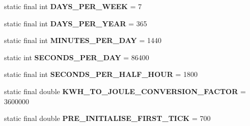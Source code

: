 \begin{DoxyCompactItemize}
\item 
\hypertarget{classuk_1_1ac_1_1dmu_1_1iesd_1_1cascade_1_1base_1_1_consts_a1741a7da07e720b3091c3be0059db491}{static final int {\bfseries D\-A\-Y\-S\-\_\-\-P\-E\-R\-\_\-\-W\-E\-E\-K} = 7}\label{classuk_1_1ac_1_1dmu_1_1iesd_1_1cascade_1_1base_1_1_consts_a1741a7da07e720b3091c3be0059db491}

\item 
\hypertarget{classuk_1_1ac_1_1dmu_1_1iesd_1_1cascade_1_1base_1_1_consts_a6abf739a22ebb7c16a5ee8b153e56cb7}{static final int {\bfseries D\-A\-Y\-S\-\_\-\-P\-E\-R\-\_\-\-Y\-E\-A\-R} = 365}\label{classuk_1_1ac_1_1dmu_1_1iesd_1_1cascade_1_1base_1_1_consts_a6abf739a22ebb7c16a5ee8b153e56cb7}

\item 
\hypertarget{classuk_1_1ac_1_1dmu_1_1iesd_1_1cascade_1_1base_1_1_consts_ab28ee6ea9b35ebd142ca2f60f96e7bec}{static final int {\bfseries M\-I\-N\-U\-T\-E\-S\-\_\-\-P\-E\-R\-\_\-\-D\-A\-Y} = 1440}\label{classuk_1_1ac_1_1dmu_1_1iesd_1_1cascade_1_1base_1_1_consts_ab28ee6ea9b35ebd142ca2f60f96e7bec}

\item 
\hypertarget{classuk_1_1ac_1_1dmu_1_1iesd_1_1cascade_1_1base_1_1_consts_af78cac40b2c95f0abafae00d0ab95c40}{static int {\bfseries S\-E\-C\-O\-N\-D\-S\-\_\-\-P\-E\-R\-\_\-\-D\-A\-Y} = 86400}\label{classuk_1_1ac_1_1dmu_1_1iesd_1_1cascade_1_1base_1_1_consts_af78cac40b2c95f0abafae00d0ab95c40}

\item 
\hypertarget{classuk_1_1ac_1_1dmu_1_1iesd_1_1cascade_1_1base_1_1_consts_a7489b205789ced48d39e728dba489adc}{static final int {\bfseries S\-E\-C\-O\-N\-D\-S\-\_\-\-P\-E\-R\-\_\-\-H\-A\-L\-F\-\_\-\-H\-O\-U\-R} = 1800}\label{classuk_1_1ac_1_1dmu_1_1iesd_1_1cascade_1_1base_1_1_consts_a7489b205789ced48d39e728dba489adc}

\item 
\hypertarget{classuk_1_1ac_1_1dmu_1_1iesd_1_1cascade_1_1base_1_1_consts_a17775b66ef86c4dea1b661f838c18e49}{static final double {\bfseries K\-W\-H\-\_\-\-T\-O\-\_\-\-J\-O\-U\-L\-E\-\_\-\-C\-O\-N\-V\-E\-R\-S\-I\-O\-N\-\_\-\-F\-A\-C\-T\-O\-R} = 3600000}\label{classuk_1_1ac_1_1dmu_1_1iesd_1_1cascade_1_1base_1_1_consts_a17775b66ef86c4dea1b661f838c18e49}

\item 
\hypertarget{classuk_1_1ac_1_1dmu_1_1iesd_1_1cascade_1_1base_1_1_consts_a1626d3b361f59fbbf6645aab086fd2bf}{static final double {\bfseries P\-R\-E\-\_\-\-I\-N\-I\-T\-I\-A\-L\-I\-S\-E\-\_\-\-F\-I\-R\-S\-T\-\_\-\-T\-I\-C\-K} = 700}\label{classuk_1_1ac_1_1dmu_1_1iesd_1_1cascade_1_1base_1_1_consts_a1626d3b361f59fbbf6645aab086fd2bf}


\end{DoxyCompactItemize}

